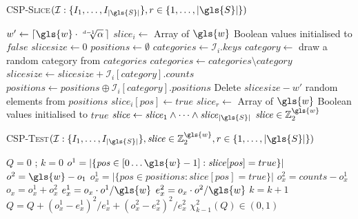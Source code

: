 \begin{algorithm}\footnotesize
	\caption{\textsc{\gls{CSP}-Slice}{$(\mathcal{I}: \{I_1, \dots, I_{|\gls{S}|} \}, r \in \{1,\dots,|\gls{S}|\})$}}\label{cspslicing}
	\begin{algorithmic}[1]
		\State $w' \gets \left \lceil \gls{w} \cdot \sqrt[d-1]{\alpha}\,  \right \rceil  $
		\State $\mathit{slice}_i \gets$ Array of $\gls{w}$ Boolean values initialised to $\textit{false}$
		\State $\mathit{slicesize} \gets 0$ 
		\State $\mathit{positions} \gets \emptyset$
		\State $\mathit{categories} \gets \mathcal{I}_i.\mathit{keys}$
		\State $\mathit{category} \gets $ draw a random category from $\mathit{categories}$
		\State $\mathit{categories} \gets \mathit{categories} \setminus \mathit{category}$
		\State $\mathit{slicesize} \gets \mathit{slicesize} + \mathcal{I}_i[\mathit{category}].\mathit{counts}$
		\State $\mathit{positions} \gets \mathit{positions} \oplus \mathcal{I}_i[\mathit{category}].\mathit{positions}$
		\EndWhile
		\State Delete $\mathit{slicesize}-w'$ random elements from $\mathit{positions}$
		\EndIf
		\State $\mathit{slice}_i[\mathit{pos}] \gets \mathit{true}$
		\EndFor
		\EndFor
		\State $\mathit{slice}_r \gets$ Array of $\gls{w}$ Boolean values initialised to $\mathit{true}$
		\State $\mathit{slice} \gets \mathit{slice}_1 \wedge \dots \wedge \mathit{slice}_{|\gls{S}|}$
		 $\mathit{slice} \in \mathbb{Z}_2^{\gls{w}}$
	\end{algorithmic}
\end{algorithm} 

\begin{algorithm}\footnotesize
    \caption{\textsc{\gls{CSP}-Test}{$( \mathcal{I}: \{I_1, \dots, I_{|\gls{S}|} \}, \mathit{slice} \in \mathbb{Z}_2^{\gls{w}}, r \in \{1,\dots,|\gls{S}|\} )$}}\label{CSPtest}
    \begin{algorithmic}[1]
        \State $Q = 0$ ; $k = 0$
        \State $o^1 =  |\{\mathit{pos} \in [0\dots \gls{w}-1] : \mathit{slice}[\mathit{pos}] = true\}|$
        \State $o^2 = \gls{w} - o_1$
        \State $o_x^1 = |\{\mathit{pos} \in \mathit{positions} : \mathit{slice}[\mathit{pos}] = \mathit{true}\}|$
        \State $o_x^2 = \mathit{counts} - o_x^1$
        \State $o_x = o_x^1 + o_x^2$
        \State $e_x^1 = o_x \cdot o^1 / \gls{w}$
        \State $e_x^2 = o_x \cdot o^2 / \gls{w}$
        \State $k = k + 1$
        \State $Q = Q + (o_x^1 - e_x^1)^2 / e_x^1 + (o_x^2 - e_x^2)^2 / e_x^2$
        \EndFor
        \Return $\chi^2_{k-1}(Q) \in (0,1)$
    \end{algorithmic}
\end{algorithm}

